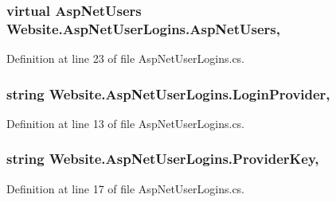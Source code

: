 \subsubsection[{Asp\+Net\+Users}]{\setlength{\rightskip}{0pt plus 5cm}virtual {\bf Asp\+Net\+Users} Website.\+Asp\+Net\+User\+Logins.\+Asp\+Net\+Users\hspace{0.3cm}{\ttfamily [get]}, {\ttfamily [set]}}\label{class_website_1_1_asp_net_user_logins_af38e158d8bd634255e0227f741fbd4f0}


Definition at line 23 of file Asp\+Net\+User\+Logins.\+cs.

\hypertarget{class_website_1_1_asp_net_user_logins_a9296aa8ce9fd6aeb888a8efdbc800df3}{}
\subsubsection[{Login\+Provider}]{\setlength{\rightskip}{0pt plus 5cm}string Website.\+Asp\+Net\+User\+Logins.\+Login\+Provider\hspace{0.3cm}{\ttfamily [get]}, {\ttfamily [set]}}\label{class_website_1_1_asp_net_user_logins_a9296aa8ce9fd6aeb888a8efdbc800df3}


Definition at line 13 of file Asp\+Net\+User\+Logins.\+cs.

\hypertarget{class_website_1_1_asp_net_user_logins_a9d0c9f66b1d198bed89016c9ae6fa9ca}{}
\subsubsection[{Provider\+Key}]{\setlength{\rightskip}{0pt plus 5cm}string Website.\+Asp\+Net\+User\+Logins.\+Provider\+Key\hspace{0.3cm}{\ttfamily [get]}, {\ttfamily [set]}}\label{class_website_1_1_asp_net_user_logins_a9d0c9f66b1d198bed89016c9ae6fa9ca}


Definition at line 17 of file Asp\+Net\+User\+Logins.\+cs.

\hypertarget{class_website_1_1_asp_net_user_logins_accca4708f6580878d0e8f611d4e7b674}{}

